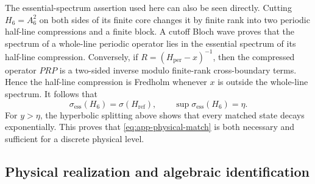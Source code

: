The essential-spectrum assertion used here can also be seen directly.
Cutting \(H_6=A_6^2\) on both sides of its finite core changes it by finite
rank into two periodic half-line compressions and a finite block.  A cutoff
Bloch wave proves that the spectrum of a whole-line periodic operator lies
in the essential spectrum of its half-line compression.  Conversely, if
\(R=(H_{\mathrm{per}}-x)^{-1}\), then the compressed operator \(PRP\) is a
two-sided inverse modulo finite-rank cross-boundary terms.  Hence the
half-line compression is Fredholm whenever \(x\) is outside the whole-line
spectrum.  It follows that
\[
 \sigma_{\mathrm{ess}}(H_6)=\sigma(H_{\mathrm{ref}}),
 \qquad \sup\sigma_{\mathrm{ess}}(H_6)=\eta.
\]
For \(y>\eta\), the hyperbolic splitting above shows that every matched
state decays exponentially.  This proves that
\eqref{eq:app-physical-match} is both necessary and sufficient for a
discrete physical level.

\subsection{Physical realization and algebraic identification}
\label{appsubsec:c6-identification}

